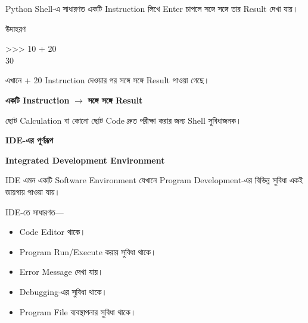 Python Shell-এ সাধারণত একটি Instruction লিখে Enter চাপলে
সঙ্গে সঙ্গে তার Result দেখা যায়।

\begin{examplebox}{উদাহরণ}

\begin{codebox}

\begin{english}
\ttfamily
>>> 10 + 20\\
30
\end{english}

\end{codebox}

এখানে
\textenglish{ + 20}
Instruction দেওয়ার পর সঙ্গে সঙ্গে
\textenglish{}
Result পাওয়া গেছে।

\end{examplebox}

\begin{center}

\textbf{একটি Instruction}
\(\longrightarrow\)
\textbf{সঙ্গে সঙ্গে Result}

\end{center}

ছোট Calculation বা কোনো ছোট Code দ্রুত পরীক্ষা করার জন্য
Shell সুবিধাজনক।



\begin{definitionbox}

\textbf{\color{darkTeal}IDE-এর পূর্ণরূপ}

\textbf{Integrated Development Environment}

\end{definitionbox}

IDE এমন একটি Software Environment যেখানে Program Development-এর
বিভিন্ন সুবিধা একই জায়গায় পাওয়া যায়।

IDE-তে সাধারণত—

\begin{itemize}

\item Code Editor থাকে।

\item Program Run/Execute করার সুবিধা থাকে।

\item Error Message দেখা যায়।

\item Debugging-এর সুবিধা থাকে।

\item Program File ব্যবস্থাপনার সুবিধা থাকে।

\end{itemize}


